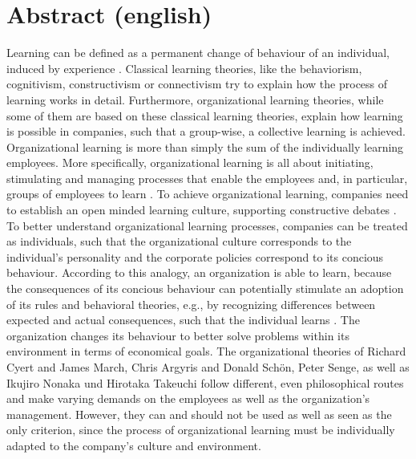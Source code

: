 \documentclass[12pt]{article}
\begin{document}
\section{Abstract (english)}

Learning can be defined as a permanent change of behaviour of an individual,
induced by experience \cite{Lefrancois:2006}. Classical learning theories, like
the behaviorism, cognitivism, constructivism or connectivism try to explain how
the process of learning works in detail. Furthermore, organizational learning
theories, while some of them are based on these classical learning theories,
explain how learning is possible in companies, such that a group-wise, a
collective learning is achieved. Organizational learning is more than simply
the sum of the individually learning employees. More specifically,
organizational learning is all about initiating, stimulating and managing
processes that enable the employees and, in particular, groups of employees to
learn \cite{Franken:2002}. To achieve organizational learning, companies need
to establish an open minded learning culture, supporting constructive debates
\cite{culture}.
To better understand organizational learning processes, companies can be
treated as individuals, such that the organizational culture corresponds to the
individual's personality and the corporate policies correspond to its concious
behaviour. According to this analogy, an organization is able to learn, because
the consequences of its concious behaviour can potentially stimulate an
adoption of its rules and behavioral theories, e.g., by recognizing differences
between expected and actual consequences, such that the individual learns
\cite{Pawlowsky:1992}. The organization changes its behaviour to better solve
problems within its environment in terms of economical goals. The
organizational theories of Richard Cyert and James March, Chris Argyris and
Donald Schön, Peter Senge, as well as Ikujiro Nonaka und Hirotaka Takeuchi
follow different, even philosophical routes and make varying demands on the
employees as well as the organization's management. However, they can and
should not be used as well as seen as the only criterion, since the process of
organizational learning must be individually adapted to the company's culture
and environment.

\nocite{*}


\end{document}
